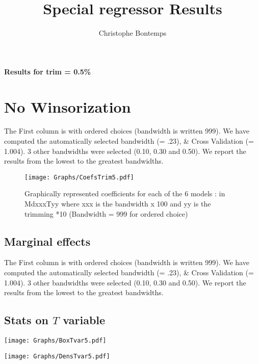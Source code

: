 \documentclass[a4paper]{article}
\title{Special regressor Results}
\author{Christophe Bontemps }
\begin{document}
\begin{center}
\Large{\textbf{Results for trim = 0.5\% }}
\end{center}

\section{No Winsorization}
The First column is with ordered choices (bandwidth is written 999). We  have computed the  automatically selected bandwidth  (= .23), \& Cross Validation (= 1.004). 3 other  bandwidths were selected (0.10, 0.30 and 0.50). We report the results from the lowest to the greatest bandwidths. \\



\newpage

\begin{sidewaysfigure}[h!]
\caption{Graphically represented coefficients for each of the 6 models : in MdxxxTyy  where xxx is the bandwidth x 100 and yy is the trimming *10 
(Bandwidth = 999 for ordered choice)}\label{PlotFOK}
\texttt{[image: Graphs/CoefsTrim5.pdf]}

\end{sidewaysfigure}
\clearpage

\subsection{Marginal effects}

The First column is with ordered choices (bandwidth is written 999). We  have computed the  automatically selected bandwidth  (= .23), \& Cross Validation (= 1.004). 3 other  bandwidths were selected (0.10, 0.30 and 0.50). We report the results from the lowest to the greatest bandwidths. \\
\newpage
\subsection{Stats on $T$ variable}



\texttt{[image: Graphs/BoxTvar5.pdf]}


\texttt{[image: Graphs/DensTvar5.pdf]}
\end{document}
